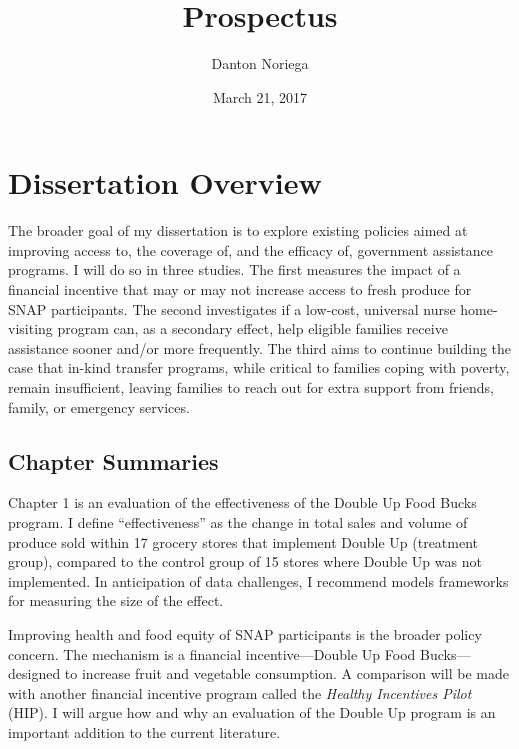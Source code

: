 \documentclass[12pt,letterpaperpaper,]{book}
\title{Prospectus}
\author{Danton Noriega}
\date{March 21, 2017}
\begin{document}
\maketitle

\setlength{\abovedisplayskip}{-5pt}
\setlength{\abovedisplayshortskip}{-5pt}
\mainmatter

{
\setcounter{tocdepth}{2}
\tableofcontents
}
\chapter*{Dissertation Overview}\label{dissertation-overview}

The broader goal of my dissertation is to explore existing policies
aimed at improving access to, the coverage of, and the efficacy of,
government assistance programs. I will do so in three studies. The first
measures the impact of a financial incentive that may or may not
increase access to fresh produce for SNAP participants. The second
investigates if a low-cost, universal nurse home-visiting program can,
as a secondary effect, help eligible families receive assistance sooner
and/or more frequently. The third aims to continue building the case
that in-kind transfer programs, while critical to families coping with
poverty, remain insufficient, leaving families to reach out for extra
support from friends, family, or emergency services.

\section*{Chapter Summaries}\label{chapter-summaries}

Chapter 1 is an evaluation of the effectiveness of the Double Up Food
Bucks program. I define ``effectiveness'' as the change in total sales
and volume of produce sold within 17 grocery stores that implement
Double Up (treatment group), compared to the control group of 15 stores
where Double Up was not implemented. In anticipation of data challenges,
I recommend models frameworks for measuring the size of the effect.

Improving health and food equity of SNAP participants is the broader
policy concern. The mechanism is a financial incentive---Double Up Food
Bucks---designed to increase fruit and vegetable consumption. A
comparison will be made with another financial incentive program called
the \emph{Healthy Incentives Pilot} (HIP). I will argue how and why an
evaluation of the Double Up program is an important addition to the
current literature.
\end{document}
